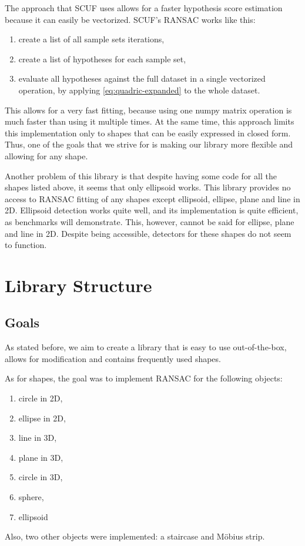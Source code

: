 \documentclass[10pt,conference,a4paper]{IEEEtran_EDM}
\begin{document}
The approach that SCUF uses allows for a faster hypothesis score estimation
because it can easily be vectorized. SCUF's RANSAC works like this:
\begin{enumerate}
    \item create a list of all sample sets iterations,
    \item create a list of hypotheses for each sample set,
    \item evaluate all hypotheses against the full dataset in a single
        vectorized operation, by applying \eqref{eq:quadric-expanded}
        to the whole dataset.
\end{enumerate}
This allows for a very fast fitting, because using one numpy\cite{numpy} matrix
operation is much faster than using it multiple times. At the same time, this
approach limits this implementation only to shapes that can be easily expressed
in closed form. Thus, one of the goals that we strive for is making our library
more flexible and allowing for any shape.

Another problem of this library is that despite having some code for all the
shapes listed above, it seems that only ellipsoid works. This library provides
no access to RANSAC fitting of any shapes except ellipsoid, ellipse, plane and
line in 2D. Ellipsoid detection works quite well, and its implementation is
quite efficient, as benchmarks will demonstrate. This, however, cannot be said
for ellipse, plane and line in 2D. Despite being accessible, detectors for
these shapes do not seem to function.

\section{Library Structure}

\subsection{Goals}
As stated before, we aim to create a library that is easy to use
out-of-the-box, allows for modification and contains frequently used shapes.

As for shapes, the goal was to implement RANSAC for the following objects:
\begin{enumerate}
    \item circle in 2D,
    \item ellipse in 2D,
    \item line in 3D,
    \item plane in 3D,
    \item circle in 3D,
    \item sphere,
    \item ellipsoid
\end{enumerate}
Also, two other objects were implemented: a staircase and M\"obius strip.
\end{document}
